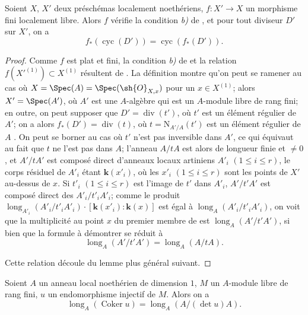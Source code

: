 \begin{proposition}[21.10.17]
\label{IV.21.10.17}
Soient $X$, $X'$ deux préschémas localement noethériens, $f:X'\to X$ un morphisme fini localement libre.
Alors $f$ vérifie la condition \emph{b)} de , et pour tout diviseur $D'$ sur $X'$, on a
\[
\label{IV.21.10.17.1}
  f_*(\operatorname{cyc}(D'))=\operatorname{cyc}(f_*(D')).
  \tag{21.10.17.1}
\]
\end{proposition}

\begin{proof}
Comme $f$ est plat et fini, la condition \emph{b)} de  et la relation $f(X'^{(1)})\subset X^{(1)}$ résultent de .
La définition  montre qu'on peut se ramener au cas où $X=\Spec(A)=\Spec(\sh{O}_{X,x})$ pour un $x\in X^{(1)}$;
alors $X'=\Spec(A')$, où $A'$ est une
$A$-algèbre qui est un $A$-module libre de rang fini;
en outre, on peut supposer que $D'=\operatorname{div}(t')$, où $t'$ est un élément régulier de $A'$;
on a alors $f_*(D')=\operatorname{div}(t)$, où $t=\mathrm{N}_{A'/A}(t')$ est un élément régulier de $A$ .
On peut se borner au cas où $t'$ n'est pas inversible dans $A'$, ce qui équivaut au fait que $t$ ne l'est pas dans $A$;
l'anneau $A/tA$ est alors de longueur finie et $\neq0$, et $A'/tA'$ est composé direct d'anneaux locaux artiniens $A'_i$ $(1\leq i\leq r)$, le corps résiduel de $A'_i$ étant $\boldsymbol{k}(x'_i)$, où les $x'_i$ $(1\leq i\leq r)$ sont les points de $X'$ au-dessus de $x$.
Si $t'_i$ $(1\leq i\leq r)$ est l'image de $t'$ dans $A'_i$, $A'/t'A'$ est composé direct des $A'_i/t'_iA'_i$;
comme le produit $\operatorname{long}_{A'_i}(A'_i/t'_iA'_i)\cdot[\boldsymbol{k}(x'_i):\boldsymbol{k}(x)]$ est égal à $\operatorname{long}_A(A'_i/t'_iA'_i)$, on voit que la multiplicité au point $x$ du premier membre de  est $\operatorname{long}_A(A'/t'A')$, si bien que la formule à démontrer se réduit à
\[
\label{IV.21.10.17.2}
  \operatorname{long}_A(A'/t'A')=\operatorname{long}_A(A/tA).
  \tag{21.10.17.2}
\]

Cette relation découle du lemme plus général suivant.
\end{proof}

\begin{lemma}[21.10.17.3]
\label{IV.21.10.17.3}
Soient $A$ un anneau local noethérien de dimension $1$, $M$ un $A$-module libre de rang fini, $u$ un endomorphisme injectif de $M$.
Alors on a
\[
\label{IV.21.10.17.4}
  \operatorname{long}_A(\operatorname{Coker}u)=\operatorname{long}_A(A/(\det u)A).
  \tag{21.10.17.4}
\]
\end{lemma}

